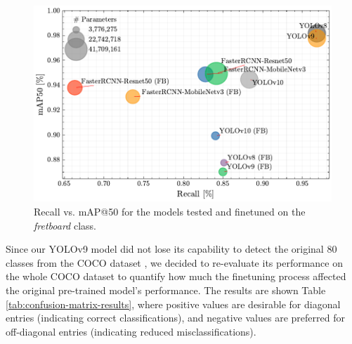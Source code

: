 \documentclass[10pt,twocolumn,letterpaper]{article}
\begin{document}
\begin{figure}[thb]
    \centering
    \includegraphics[width=\columnwidth]{images/final/recall_vs_map50.pdf}
    \caption{Recall vs. mAP@50 for the models tested and finetuned on the \emph{fretboard} class.}
    \label{fig:fretboard-models-recall-map}
\end{figure}

Since our YOLOv9 model did not lose its capability to detect the original 80 classes from the COCO dataset \cite{lin2015microsoftcococommonobjects}, we decided to re-evaluate its performance on the whole COCO dataset to quantify how much the finetuning process affected the original pre-trained model's performance. The results are shown Table \ref{tab:confusion-matrix-results}, where positive values are desirable for diagonal entries (indicating correct classifications), and negative values are preferred for off-diagonal entries (indicating reduced misclassifications).

\end{document}
